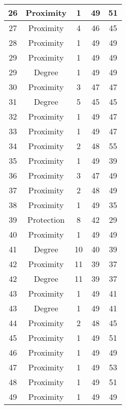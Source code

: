 \documentclass[results.tex]{subfiles}
\begin{document}
\begin{center}
\begin{tabular}{| c || c | c | c | c |}
    \hline
    26 & Proximity & 1 & 49 & 51 \\ 
    \hline
    27 & Proximity & 4 & 46 & 45 \\ 
    \hline
    28 & Proximity & 1 & 49 & 49 \\ 
    \hline
    29 & Proximity & 1 & 49 & 49 \\ 
    \hline
    29 & Degree & 1 & 49 & 49 \\ 
    \hline
    30 & Proximity & 3 & 47 & 47 \\ 
    \hline
    31 & Degree & 5 & 45 & 45 \\ 
    \hline
    32 & Proximity & 1 & 49 & 47 \\ 
    \hline
    33 & Proximity & 1 & 49 & 47 \\ 
    \hline
    34 & Proximity & 2 & 48 & 55 \\ 
    \hline
    35 & Proximity & 1 & 49 & 39 \\ 
    \hline
    36 & Proximity & 3 & 47 & 49 \\ 
    \hline
    37 & Proximity & 2 & 48 & 49 \\ 
    \hline
    38 & Proximity & 1 & 49 & 35 \\ 
    \hline
    39 & Protection & 8 & 42 & 29 \\ 
    \hline
    40 & Proximity & 1 & 49 & 49 \\ 
    \hline
    41 & Degree & 10 & 40 & 39 \\ 
    \hline
    42 & Proximity & 11 & 39 & 37 \\ 
    \hline
    42 & Degree & 11 & 39 & 37 \\ 
    \hline
    43 & Proximity & 1 & 49 & 41 \\ 
    \hline
    43 & Degree & 1 & 49 & 41 \\ 
    \hline
    44 & Proximity & 2 & 48 & 45 \\ 
    \hline
    45 & Proximity & 1 & 49 & 51 \\ 
    \hline
    46 & Proximity & 1 & 49 & 49 \\ 
    \hline
    47 & Proximity & 1 & 49 & 53 \\ 
    \hline
    48 & Proximity & 1 & 49 & 51 \\ 
    \hline
    49 & Proximity & 1 & 49 & 49 \\ 
    \hline   \end{tabular}
\end{center}
\end{document}
